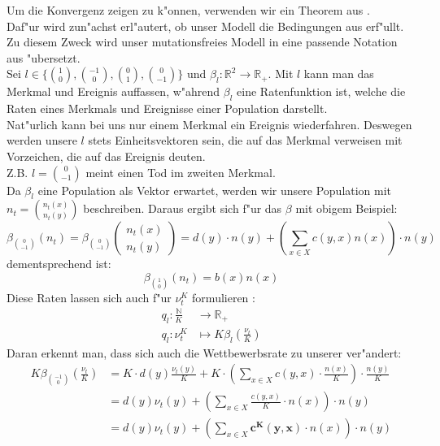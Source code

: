 \documentclass[11pt, a4paper, german]{article}
\theoremstyle{plain}
\newcommand{\tvec}[2]{\begin{pmatrix}#1\\#2\end{pmatrix}}
\begin{document}
	Um die Konvergenz zeigen zu k"onnen, verwenden wir ein Theorem aus \cite[Kapitel 11, Thm 2.1]{ethier2009markov}.\\
	Daf"ur wird zun"achst erl"autert, ob unser Modell die Bedingungen aus \cite{ethier2009markov} erf"ullt. Zu diesem Zweck wird unser mutationsfreies Modell in eine passende Notation aus \cite{ethier2009markov} "ubersetzt.\\
	Sei $ l \in \{ \binom{1}{0}, \binom{-1}{0}, \binom{0}{1}, \binom{0}{-1} \} $ und $ \beta_l : \mathbb{R}^2 \to \mathbb{R}_+ $. Mit $ l $ kann man das Merkmal und Ereignis auffassen, w"ahrend $ \beta_l $ eine Ratenfunktion ist, welche die Raten eines Merkmals und Ereignisse einer Population darstellt.\\
	Nat"urlich kann bei uns nur einem Merkmal ein Ereignis wiederfahren. Deswegen werden unsere $ l $ stets Einheitsvektoren sein, die auf das Merkmal verweisen mit Vorzeichen, die auf das Ereignis deuten.\\
	Z.B. $ l = \binom{0}{-1} $ meint einen Tod im zweiten Merkmal.\\
	Da $ \beta_l $ eine Population als Vektor erwartet, werden wir unsere Population mit $ n_t = \binom{n_t(x)}{n_t(y)} $ beschreiben. Daraus ergibt sich f"ur das $ \beta $ mit obigem Beispiel:
	\[ \beta_{\binom{0}{-1}}(n_t)  = \beta_{\binom{0}{-1}}\tvec{n_t(x)}{n_t(y)} = d(y) \cdot n(y) + \left(\sum_{x \in X} c(y,x)n(x)\right) \cdot n(y) \]
	dementsprechend ist:
	\[ \beta_{\binom{1}{0}}(n_t)  = b(x)n(x) \]
	Diese Raten lassen sich auch f"ur $ \nu_t^K $ formulieren \cite[Kapitel 11 - (1.12)]{ethier2009markov}:
\begin{align*}
	q_l: \frac{\mathbb{N}}{K} &\longrightarrow \mathbb{R}_+\\
	q_l: \nu_t^K &\longmapsto K\beta_l\left(\frac{\nu_t}{K}\right)
\end{align*}
	Daran erkennt man, dass sich auch die Wettbewerbsrate zu unserer ver"andert:
	\begin{align*}
		K\beta_{\binom{-1}{0}}\left(\frac{\nu_t}{K}\right) &= K \cdot d(y)\frac{\nu_t(y)}{K} +  K \cdot \left(\sum_{x \in X} c(y,x) \cdot \frac{n(x)}{K}\right) \cdot \frac{n(y)}{K}\\
		&= d(y) \nu_t(y) + \left(\sum_{x \in X} \frac{c(y,x)}{K} \cdot n(x)\right) \cdot n(y)\\
		&= d(y) \nu_t(y) + \left(\sum_{x \in X} \bm{c^K(y,x)} \cdot n(x)\right) \cdot n(y)
	\end{align*}
\end{document}
